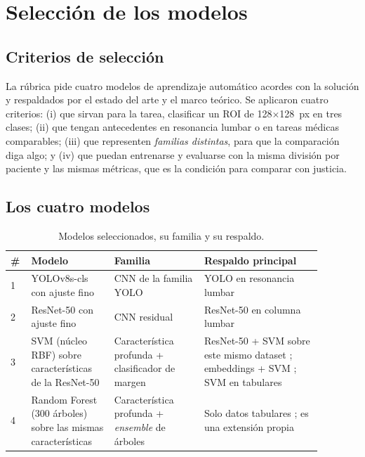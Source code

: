 \providecommand{\pendiente}[1]{\textcolor{red}{\textbf{[PENDIENTE: #1]}}}
\providecommand{\arch}[1]{\texttt{\detokenize{#1}}}

\section{Selección de los modelos}
\label{sec:modelos}

\subsection{Criterios de selección}
La rúbrica pide cuatro modelos de aprendizaje automático acordes con la solución y respaldados por el estado del arte y el marco teórico. Se aplicaron cuatro criterios: (i) que sirvan para la tarea, clasificar un ROI de 128$\times$128~px en tres clases; (ii) que tengan antecedentes en resonancia lumbar o en tareas médicas comparables; (iii) que representen \emph{familias distintas}, para que la comparación diga algo; y (iv) que puedan entrenarse y evaluarse con la misma división por paciente y las mismas métricas, que es la condición para comparar con justicia.

\subsection{Los cuatro modelos}
\begin{table}[t]
\centering\small
\caption{Modelos seleccionados, su familia y su respaldo.}
\label{tab:modelos}
\begin{tabular}{p{0.04\linewidth}p{0.24\linewidth}p{0.26\linewidth}p{0.34\linewidth}}
\toprule
\# & Modelo & Familia & Respaldo principal \\
\midrule
1 & YOLOv8s-cls con ajuste fino & CNN de la familia YOLO & YOLO en resonancia lumbar \cite{diagnostics2023,frontiers2023,sayed2025,wang2025} \\
2 & ResNet-50 con ajuste fino & CNN residual & ResNet-50 en columna lumbar \cite{sayed2025,alkubaisi2022} \\
3 & SVM (núcleo RBF) sobre características de la ResNet-50 & Característica profunda + clasificador de margen & ResNet-50 + SVM sobre este mismo dataset \cite{sari2024}; embeddings + SVM \cite{khoiwal2024}; SVM en tabulares \cite{peerj2023} \\
4 & Random Forest (300 árboles) sobre las mismas características & Característica profunda + \emph{ensemble} de árboles & Solo datos tabulares \cite{peerj2023}; es una extensión propia \\
\bottomrule
\end{tabular}
\end{table}

